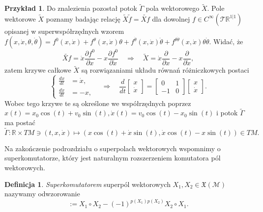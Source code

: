\documentclass[11pt,a4paper]{report}
\theoremstyle{definition}
\newtheorem{example}[theorem]{Przykład}
\newtheorem{definition}[theorem]{Definicja}
\begin{document}
\begin{example}
Do znalezienia pozostał potok $\widetilde \Gamma$ pola wektorowego $\widetilde X$. Pole wektorowe $\widetilde X$ poznamy badając relację $\widetilde X \widetilde f = \widetilde{Xf}$ dla dowolnej $f\in C^\infty(\mathcal{T} \mathbb{R}^{1|1})$ opisanej w superwspółrzędnych wzorem $f(x,\dot x,\theta,\dot\theta)=f^0(x,\dot x)+f^\theta(x,\dot x)\theta+f^{\dot\theta}(x,\dot x)\dot\theta+f^{\theta\dot\theta}(x,\dot x)\theta\dot \theta.
$
Widać, że
\begin{equation*}
 \widetilde{Xf} = \dot x \frac{\partial f^0}{\partial x} - x \frac{\partial f^0}{\partial \dot x} \quad \Longrightarrow \quad \widetilde X = \dot x \frac{\partial}{\partial x} - x \frac{\partial}{\partial \dot x},
\end{equation*}
zatem krzywe całkowe $\widetilde{X}$ są rozwiązaniami układu równań różniczkowych postaci
\begin{equation*}
\left\{\begin{aligned}
\frac{dx}{dt}&= \dot x, \\
\frac{d \dot x}{dt}& = -x,
\end{aligned}\right.\quad\Longrightarrow\quad \frac{d}{dt}\left[\begin{array}{c}x\\ \dot x \end{array}\right]=\left[\begin{array}{cc}0&1\\-1&0\end{array}\right]\left[\begin{array}{c}x\\ \dot x \end{array}\right]\!.
\end{equation*}
Wobec tego krzywe te są określone we współrzędnych poprzez $x(t) = x_0 \cos (t) + v_0 \sin (t), \dot x (t) = v_0 \cos (t) - x_0 \sin (t)$ i potok $\widetilde{\Gamma}$ ma postać
\begin{equation*}
\widetilde{\Gamma}: \mathbb{R}\times TM \ni (t,x,\dot x) \mapsto (x \cos(t)+\dot x \sin(t), \dot x \cos(t)- x \sin(t))\in TM.
\end{equation*}
\end{example}

Na zakończenie podrozdziału o superpolach wektorowych wspomnimy o superkomutatorze, który jest naturalnym rozszerzeniem komutatora pól wektorowych.

\begin{definition}
 \textit{Superkomutatorem} superpól wektorowych $X_1, X_2 \in \mathfrak {X} (\mathcal{M})$ nazywamy odwzorowanie
 \begin{equation*}
  [X_1, X_2] := X_1 \circ X_2 - (-1)^{p(X_1) p(X_2)} X_2 \circ X_1.
 \end{equation*}
\end{definition}
\end{document}
